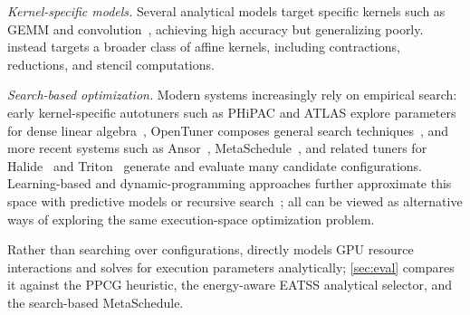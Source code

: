 \par\noindent\hspace*{\parindent}\textit{Kernel-specific models.} Several analytical models target specific kernels such as GEMM and convolution~\cite{anatomy,li-gemm,blis,saday-conv,conv-cache}, achieving high accuracy but generalizing poorly. \name instead targets a broader class of affine kernels, including contractions, reductions, and stencil computations.

\par\noindent\hspace*{\parindent}\textit{Search-based optimization.} Modern systems increasingly rely on empirical search: early kernel-specific autotuners such as PHiPAC and ATLAS explore parameters for dense linear algebra~\cite{phipac,atlas}, OpenTuner composes general search techniques~\cite{opentuner}, and more recent systems such as Ansor~\cite{ansor}, MetaSchedule~\cite{metaschedule}, and related tuners for Halide~\cite{automatichalide} and Triton~\cite{triton} generate and evaluate many candidate configurations. Learning-based and dynamic-programming approaches further approximate this space with predictive models or recursive search~\cite{hctuner,yuki-tss,Jangda2020dp,shirako-tss}; all can be viewed as alternative ways of exploring the same execution-space optimization problem.

Rather than searching over configurations, \name directly models GPU resource interactions and solves for execution parameters analytically; \autoref{sec:eval} compares it against the PPCG heuristic, the energy-aware EATSS analytical selector, and the search-based MetaSchedule.
